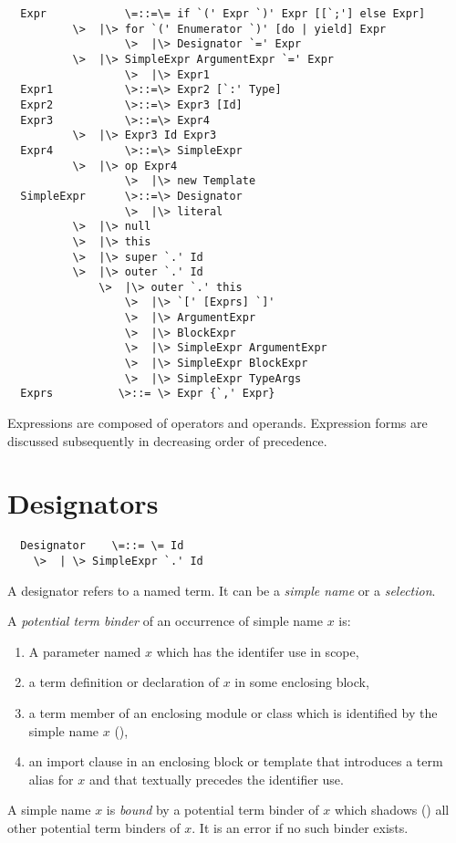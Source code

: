 \documentclass[11pt]{report}
\begin{document}
\begin{itemize}
\syntax\begin{verbatim}
  Expr            \=::=\= if `(' Expr `)' Expr [[`;'] else Expr]
		  \>  |\> for `(' Enumerator `)' [do | yield] Expr
                  \>  |\> Designator `=' Expr
		  \>  |\> SimpleExpr ArgumentExpr `=' Expr
                  \>  |\> Expr1
  Expr1           \>::=\> Expr2 [`:' Type]
  Expr2           \>::=\> Expr3 [Id]
  Expr3           \>::=\> Expr4
		  \>  |\> Expr3 Id Expr3
  Expr4           \>::=\> SimpleExpr
		  \>  |\> op Expr4
                  \>  |\> new Template
  SimpleExpr      \>::=\> Designator
                  \>  |\> literal
		  \>  |\> null
		  \>  |\> this
		  \>  |\> super `.' Id
		  \>  |\> outer `.' Id
	          \>  |\> outer `.' this
                  \>  |\> `[' [Exprs] `]'
                  \>  |\> ArgumentExpr
                  \>  |\> BlockExpr
                  \>  |\> SimpleExpr ArgumentExpr
                  \>  |\> SimpleExpr BlockExpr
                  \>  |\> SimpleExpr TypeArgs
  Exprs          \>::= \> Expr {`,' Expr}
\end{verbatim}

Expressions are composed of operators and operands. Expression forms are
discussed subsequently in decreasing order of precedence.

\section{Designators}
\label{sec:designators}

\syntax\begin{verbatim}
  Designator    \=::= \= Id
	\>  | \> SimpleExpr `.' Id
\end{verbatim}

A designator refers to a named term. It can be a {\em simple name} or
a {\em selection}.

A {\em potential term binder} of an occurrence of simple name $x$ is:
\begin{enumerate}
\item A parameter named $x$ which has the identifer use in scope,
\item a term definition or declaration of $x$ in some enclosing block,
\item a term member of an enclosing module or class which is identified
      by the simple name $x$ (),
\item an import clause in an enclosing block or template that introduces
      a term alias for $x$ and that textually precedes the identifier use.
\end{enumerate}
A simple name $x$ is {\em bound} by a potential term binder of $x$
which shadows () all other potential term binders of
$x$.  It is an error if no such binder exists.


\end{itemize}
\end{document}

